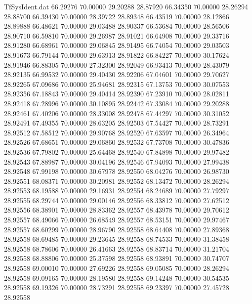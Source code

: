\begin{filecontents}{TfSysIdent.dat}
  66.29276   70.00000   29.20288   28.87920
  66.34350   70.00000   28.26294   28.88700
  66.39430   70.00000   28.39722   28.89348
  66.43519   70.00000   28.12866   28.89888
  66.48621   70.00000   29.03488   28.90337
  66.53684   70.00000   28.56506   28.90710
  66.59810   70.00000   29.26987   28.91021
  66.64908   70.00000   29.33716   28.91280
  66.68961   70.00000   29.06845   28.91495
  66.74054   70.00000   29.03503   28.91673
  66.79144   70.00000   29.63913   28.91822
  66.84227   70.00000   30.17624   28.91946
  66.88305   70.00000   27.32300   28.92049
  66.93413   70.00000   28.43079   28.92135
  66.99532   70.00000   29.40430   28.92206
  67.04601   70.00000   29.70627   28.92265
  67.09686   70.00000   25.94681   28.92315
  67.13753   70.00000   30.07553   28.92356
  67.18843   70.00000   29.40414   28.92390
  67.23910   70.00000   28.02811   28.92418
  67.28996   70.00000   30.10895   28.92442
  67.33084   70.00000   29.20288   28.92461
  67.40206   70.00000   28.33008   28.92478
  67.44297   70.00000   30.31052   28.92491
  67.49355   70.00000   28.63205   28.92503
  67.54427   70.00000   28.73291   28.92512
  67.58512   70.00000   29.90768   28.92520
  67.63597   70.00000   26.34964   28.92526
  67.68651   70.00000   29.06860   28.92532
  67.73708   70.00000   30.47836   28.92536
  67.79802   70.00000   25.64468   28.92540
  67.84898   70.00000   29.97482   28.92543
  67.88987   70.00000   30.04196   28.92546
  67.94093   70.00000   27.99438   28.92548
  67.99198   70.00000   30.67978   28.92550
  68.04276   70.00000   26.98730   28.92551
  68.08371   70.00000   30.20981   28.92552
  68.13472   70.00000   28.26294   28.92553
  68.19588   70.00000   29.16931   28.92554
  68.24689   70.00000   27.79297   28.92555
  68.29744   70.00000   29.00146   28.92556
  68.33812   70.00000   27.62512   28.92556
  68.38901   70.00000   28.83362   28.92557
  68.43978   70.00000   29.70612   28.92557
  68.49066   70.00000   26.68549   28.92557
  68.53151   70.00000   29.97467   28.92557
  68.60299   70.00000   28.96790   28.92558
  68.64408   70.00000   27.89368   28.92558
  68.69485   70.00000   29.23645   28.92558
  68.74533   70.00000   31.38458   28.92558
  68.78606   70.00000   26.41663   28.92558
  68.83714   70.00000   31.21704   28.92558
  68.88806   70.00000   25.37598   28.92558
  68.93891   70.00000   30.74707   28.92558
  69.00010   70.00000   27.69226   28.92558
  69.05085   70.00000   28.26294   28.92558
  69.09165   70.00000   28.19580   28.92558
  69.14248   70.00000   30.54535   28.92558
  69.19326   70.00000   28.73291   28.92558
  69.23397   70.00000   27.45728   28.92558

\end{filecontents}
